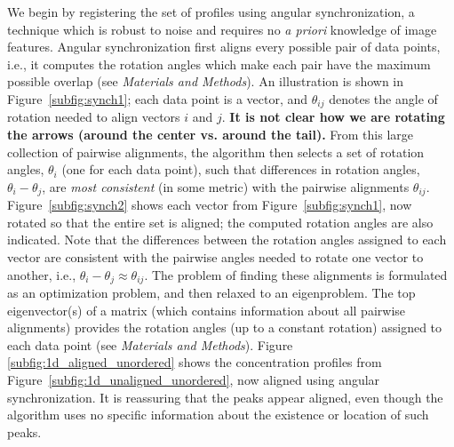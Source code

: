 \documentclass{pnastwo}
\begin{document}
\begin{article}
We begin by registering the set of profiles using angular synchronization\cite{singer2011angular}, a technique which is robust to noise and requires no {\it a priori} knowledge of image features.
%
Angular synchronization first aligns every possible pair of data points, i.e., it computes the rotation angles
which make each pair have the maximum possible overlap (see {\it Materials and Methods}).
%
An illustration is shown in Figure~\ref{subfig:synch1};
each data point is a vector, and $\theta_{ij}$ denotes the angle of rotation needed to align vectors $i$ and $j$.
%
{\bf It is not clear how we are rotating the arrows (around the center vs. around the tail).}
%
From this large collection of pairwise alignments, the algorithm then selects a set of rotation angles, $\theta_i$ (one for each data point), such that differences in rotation angles, $\theta_i-\theta_j$, are {\it most consistent} (in some metric) with the pairwise alignments $\theta_{ij}$.
%
Figure~\ref{subfig:synch2} shows each vector from Figure~\ref{subfig:synch1}, now rotated so that the entire set is aligned; the computed rotation angles are also indicated.
%
Note that the differences between the rotation angles assigned to each vector are consistent with the pairwise angles needed to rotate one vector to another, i.e., $\theta_i - \theta_j \approx \theta_{ij}$.
%
The problem of finding these alignments is formulated as an optimization problem, and then relaxed to an eigenproblem.
%
The top eigenvector(s) of a matrix (which contains information about all pairwise alignments)
provides the rotation angles (up to a constant rotation) assigned to each data point (see {\it Materials and Methods}).
%
%
%
Figure \ref{subfig:1d_aligned_unordered} shows the concentration profiles from Figure~\ref{subfig:1d_unaligned_unordered}, now aligned using angular synchronization.
%
It is reassuring that the peaks appear aligned,
even though the algorithm uses no specific information about the existence or location of such peaks.
%


\end{article}
\end{document}
